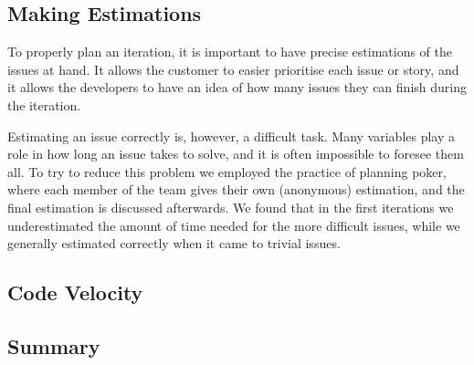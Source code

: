 \subsection{Making Estimations}
To properly plan an iteration, it is important to have precise estimations of the issues at hand.
It allows the customer to easier prioritise each issue or story, and it allows the developers to have an idea of how many issues they can finish during the iteration.

Estimating an issue correctly is, however, a difficult task.
Many variables play a role in how long an issue takes to solve, and it is often impossible to foresee them all.
To try to reduce this problem we employed the practice of planning poker, where each member of the team gives their own (anonymous) estimation, and the final estimation is discussed afterwards.
We found that in the first iterations we underestimated the amount of time needed for the more difficult issues, while we generally estimated correctly when it came to trivial issues.

\subsection{Code Velocity}

\subsection{Summary}

